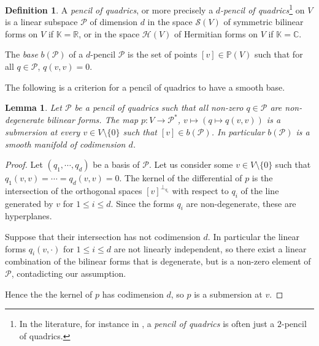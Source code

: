 \documentclass[reqno,10pt]{amsart}
\theoremstyle{plain}
\newtheorem{lem}[thm]{Lemma}
\theoremstyle{definition}
\newtheorem{defn}[thm]{Definition}
\theoremstyle{remark}
\newcommand{\R}{\mathbb{R}}
\newcommand{\C}{\mathbb{C}}
\newcommand{\K}{\mathbb{K}}
\begin{document}
\begin{defn}
A \emph{pencil of quadrics}, or more precisely a \emph{$d$-pencil of quadrics}\footnote{In the literature, for instance in \cite{fevola2020pencils}, a \emph{pencil of quadrics} is often just a $2$-pencil of quadrics.} on $V$ is a linear subspace $\mathcal{P}$ of dimension $d$ in the space $\mathcal{S}(V)$ of symmetric bilinear forms on $V$ if $\K=\R$, or in the space $\mathcal{H}(V)$ of Hermitian forms on $V$ if $\K=\C$.

\medskip

The \emph{base} $b(\mathcal{P})$ of a $d$-pencil $\mathcal{P}$ is the set of points $[v]\in\mathbb{P}(V)$ such that for all $q\in \mathcal{P}$, $q(v,v)=0$.

\end{defn}

The following is a criterion for a pencil of quadrics to have a smooth base.

\begin{lem}
\label{lem:SubmertionPencils}
Let $\mathcal{P}$ be a pencil of quadrics such that all non-zero $q\in \mathcal{P}$ are non-degenerate bilinear forms. The map $p:V\to \mathcal{P}^*$, $v\mapsto \left(q\mapsto q(v,v)\right)$ is a submersion at every $v\in V\setminus \lbrace0\rbrace$ such that $[v]\in b(\mathcal{P})$. In particular $b(\mathcal{P})$ is a smooth manifold of codimension $d$.

\end{lem}
\begin{proof}
Let $(q_1,\cdots, q_d)$ be a basis of $\mathcal{P}$. Let us consider some $v\in V\setminus \lbrace0\rbrace$ such that $q_1(v,v)=\cdots=q_d(v,v)=0$. The kernel of the differential of $p$ is the intersection of the orthogonal spaces $[v]^{\perp_{q_i}}$ with respect to $q_i$ of the line generated by $v$ for $1\leq i\leq d$. Since the forms $q_i$ are non-degenerate, these are hyperplanes. 

Suppose that their intersection has not codimension $d$. In particular the linear forms $q_i(v,\cdot)$ for $1\leq i\leq d$ are not linearly independent, so there exist a linear combination of the bilinear forms that is degenerate, but is a non-zero element of $\mathcal{P}$, contadicting our assumption.

\smallskip

Hence the the kernel of $p$ has codimension $d$, so $p$ is a submersion at $v$.

\end{proof}
\end{document}
